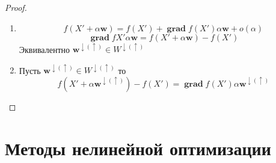 \documentclass[14pt]{extarticle}
\DeclareMathOperator{\grad}{\textbf{grad}}
\begin{document}
\begin{proof}
	\begin{enumerate}
		\item 
			\begin{equation}
				f(X' + \alpha \mathbf{w}) =
				f(X') + \grad f(X') \alpha \mathbf{w} + o(\alpha)
			\end{equation}
			\begin{equation}
				\grad f{X'} \alpha \mathbf{w} = f(X' + \alpha \mathbf{w})  - f(X')
			\end{equation}
			Эквивалентно $\mathbf{w}^{\downarrow (\uparrow)} \in W^{\downarrow (\uparrow)}$ 
		\item
			Пусть $\mathbf{w}^{\downarrow (\uparrow)} \in
			W^{\downarrow (\uparrow)}$ то
			\begin{equation}
				f(X' + \alpha \mathbf{w}^{\downarrow (\uparrow)}) -
				f(X') = \grad f(X') \alpha \mathbf{w}^{\downarrow (\uparrow)}
			\end{equation}
	\end{enumerate}
\end{proof}
\section{Методы нелинейной оптимизации}
\end{document}
